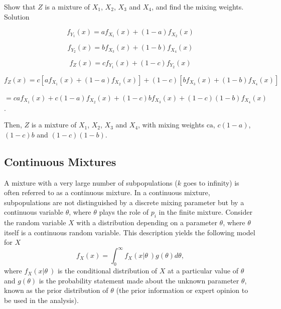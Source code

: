 \documentclass[]{book}
\begin{document}
Show that \(Z\) is a mixture of \(X_{1}\), \(X_{2}\), \(X_{3}\) and
\(X_{4}\), and find the mixing weights. Solution

\[f_{Y_{1}}\left( x \right) = af_{X_{1}}\left( x \right) + \left( 1 - a \right)f_{X_{2}}\left( x \right)\]

\[f_{Y_{2}}\left( x \right) = bf_{X_{3}}\left( x \right) + \left( 1 - b \right)f_{X_{4}}\left( x \right)\]

\[f_{Z}\left( x \right) = cf_{Y_{1}}\left( x \right) + \left( 1 - c \right)f_{Y_{2}}\left( x \right)\]

\[f_{Z}\left( x \right) = c\left\lbrack af_{X_{1}}\left( x \right) + \left( 1 - a \right)f_{X_{2}}\left( x \right) \right\rbrack + \left( 1 - c \right)\left\lbrack bf_{X_{3}}\left( x \right) + \left( 1 - b \right)f_{X_{4}}\left( x \right) \right\rbrack\]

\(= caf_{X_{1}}\left( x \right) + c\left( 1 - a \right)f_{X_{2}}\left( x \right) + \left( 1 - c \right)bf_{X_{3}}\left( x \right) + (1 - c)\left( 1 - b \right)f_{X_{4}}\left( x \right)\).

Then, \(Z\) is a mixture of \(X_{1}\), \(X_{2}\), \(X_{3}\) and
\(X_{4}\), with mixing weights \(\text{ca}\), \(c\left( 1 - a \right)\),
\(\left( 1 - c \right)b\) and \((1 - c)\left( 1 - b \right)\).

\subsection{Continuous Mixtures}\label{continuous-mixtures}

A mixture with a very large number of subpopulations (\(k\) goes to
infinity) is often referred to as a continuous mixture. In a continuous
mixture, subpopulations are not distinguished by a discrete mixing
parameter but by a continuous variable \(\theta\), where \(\theta\)
plays the role of \(p_{i}\) in the finite mixture. Consider the random
variable \(X\) with a distribution depending on a parameter \(\theta\),
where \(\theta\) itself is a continuous random variable. This
description yields the following model for \(X\)
\[f_{X}\left( x \right) = \int_{0}^{\infty}{f_{X}\left( x\left| \theta \right.\  \right)g\left( \theta \right)} d \theta ,\]
where \(f_{X}\left( x\left| \theta \right.\  \right)\) is the
conditional distribution of \(X\) at a particular value of \(\theta\)
and \(g\left( \theta \right)\) is the probability statement made about
the unknown parameter \(\theta\), known as the prior distribution of
\(\theta\) (the prior information or expert opinion to be used in the
analysis).
\end{document}
